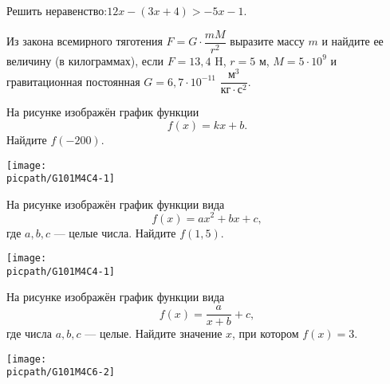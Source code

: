 \begin{exam}
	\begin{listofex}
		\item Решить неравенство:\quad\( 12x-(3x+4) > -5x-1 \).
		\item Из закона всемирного тяготения \( F=G\cdot\dfrac{mM}{r^2} \) выразите массу \( m \) и найдите ее величину (в килограммах), если \( F=13,4 \) H, \( r=5 \) м, \( M=5\cdot10^9 \) и гравитационная постоянная \( G=6,7\cdot10^{-11} \) \( \dfrac{\text{м}^3}{\text{кг}\cdot\text{с}^2} \).
		\item
		\begin{minipage}[t]{\bodywidth}
			На рисунке изображён график функции \[ f(x)=kx+b. \] Найдите \(f(-200)\).
		\end{minipage}
		\hspace{0.02\linewidth}
		\begin{minipage}[t]{\picwidth}
			\texttt{[image: \\picpath/G101M4C4-1]}
		\end{minipage}
		\item
		\begin{minipage}[t]{\bodywidth}
			На рисунке изображён график функции вида \[ f(x)=ax^2+bx+c, \] где  \(a, b, c\) --- целые числа. Найдите \(f(1,5)\).
		\end{minipage}
		\hspace{0.02\linewidth}
		\begin{minipage}[t]{\picwidth}
			\texttt{[image: \\picpath/G101M4C4-1]}
		\end{minipage}
		\item
		\begin{minipage}[t]{\bodywidth}
			На рисунке изображён график функции вида \[ f(x)=\dfrac{a}{x+b}+c, \] где числа \(a, b, c\) --- целые. Найдите значение \(x\), при котором \(f(x)=3\).
		\end{minipage}
		\hspace{0.02\linewidth}
		\begin{minipage}[t]{\picwidth}
			\texttt{[image: \\picpath/G101M4C6-2]}
		\end{minipage}

\end{listofex}
\end{exam}

